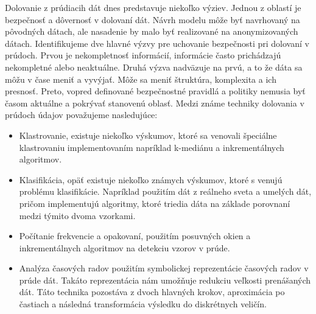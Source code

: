 Dolovanie z prúdiacih dát dnes predstavuje niekoľko výziev. Jednou z oblastí je bezpečnosť a dôvernosť v dolovaní dát. Návrh modelu môže byť navrhovaný na pôvodných dátach, ale nasadenie by malo byť realizované na anonymizovaných dátach. Identifikujeme dve hlavné výzvy pre uchovanie bezpečnosti pri dolovaní v prúdoch. Prvou je nekompletnosť informácií, informácie často prichádzajú nekompletné alebo neaktuálne. Druhá výzva nadväzuje na prvú, a to že dáta sa môžu v čase meniť a vyvýjať. Môže sa meniť štruktúra, komplexita a ich presnosť. Preto, vopred definované bezpečnostné pravidlá a politiky nemusia byť časom aktuálne a pokrývať stanovenú oblasť. Medzi známe techniky dolovania v prúdoch údajov považujeme nasledujúce:
\\
\begin{itemize}
	\item Klastrovanie, existuje niekoľko výskumov, ktoré sa venovali špeciálne klastrovaniu implementovaním napríklad k-mediánu a inkrementálnych algoritmov.
	\item Klasifikácia, opäť existuje niekoľko známych výskumov, ktoré s venujú problému klasifikácie. Napríklad použitím dát z reálneho sveta a umelých dát, pričom implementujú algoritmy, ktoré triedia dáta na základe porovnaní medzi týmito dvoma vzorkami.
	\item Počítanie frekvencie a opakovaní, použitím posuvných okien a inkrementálnych algoritmov na detekciu vzorov v prúde.
	\item Analýza časových radov použitím symbolickej reprezentácie časových radov v prúde dát. Takáto reprezentácia nám umožňuje redukciu veľkosti prenášaných dát. Táto technika pozostáva z dvoch hlavných krokov, aproximácia po častiach a následná transformácia výsledku do diskrétnych veličín.
\end{itemize}


